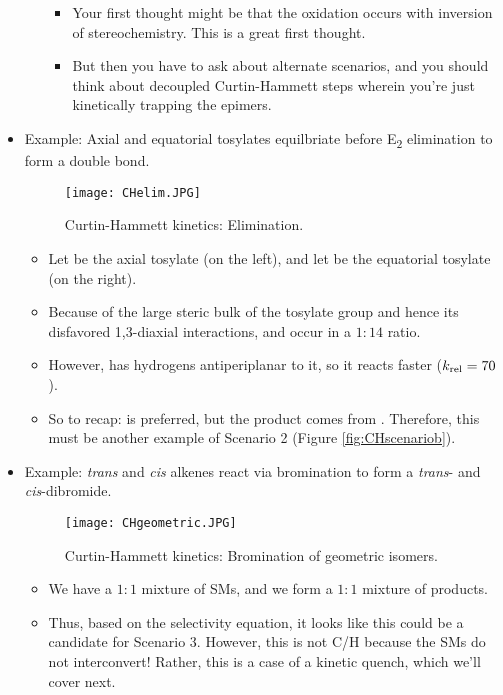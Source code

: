 \documentclass[../notes.tex]{subfiles}
\begin{document}
\begin{itemize}
\begin{itemize}
\begin{itemize}
            \item Your first thought might be that the oxidation occurs with inversion of stereochemistry. This is a great first thought.
            \item But then you have to ask about alternate scenarios, and you should think about decoupled Curtin-Hammett steps wherein you're just kinetically trapping the epimers.
        \end{itemize}
    \end{itemize}
    \item Example: Axial and equatorial tosylates equilbriate before E\textsubscript{2} elimination to form a double bond.
    \begin{figure}[H]
        \centering
        \texttt{[image: CHelim.JPG]}
        \caption{Curtin-Hammett kinetics: Elimination.}
        \label{fig:CHelim}
    \end{figure}
    \begin{itemize}
        \item Let  be the axial tosylate (on the left), and let  be the equatorial tosylate (on the right).
        \item Because of the large steric bulk of the tosylate group and hence its disfavored 1,3-diaxial interactions,  and  occur in a $1:14$ ratio.
        \item However,  has hydrogens antiperiplanar to it, so it reacts faster ($k_\textup{rel}=70$).
        \item So to recap:  is preferred, but the product comes from . Therefore, this must be another example of Scenario 2 (Figure \ref{fig:CHscenariob}).
    \end{itemize}
    \item Example: \emph{trans} and \emph{cis} alkenes react via bromination to form a \emph{trans}- and \emph{cis}-dibromide.
    \begin{figure}[h!]
        \centering
        \texttt{[image: CHgeometric.JPG]}
        \caption{Curtin-Hammett kinetics: Bromination of geometric isomers.}
        \label{fig:CHgeometric}
    \end{figure}
    \begin{itemize}
        \item We have a $1:1$ mixture of SMs, and we form a $1:1$ mixture of products.
        \item Thus, based on the selectivity equation, it looks like this could be a candidate for Scenario 3. However, this is not C/H because the SMs do not interconvert! Rather, this is a case of a kinetic quench, which we'll cover next.

\end{itemize}
\end{itemize}
\end{document}
